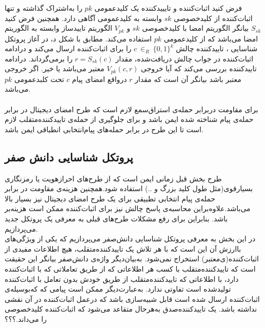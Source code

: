 فرض کنید اثبات‌کننده و تایییدکننده یک کلیدعمومی
$pk$
را به‌اشتراک گذاشته و تنها اثبات‌کننده از کلیدخصوصی
$sk$
 وابسته به کلیدعمومی آگاهی دارد. همچنین فرض کنید 
$S_{sk}$	
 بیانگر الگوریتم امضا با کلیدخصوصی
$sk$
و
$V_{pk}$
الگوریتم تاییدساز وابسته به الگوریتم امضا می‌باشد که از کلیدعمومی
$pk$
استفاده می‌کند.
مطابق با شکل د، در آغاز پروتکل شناسایی ، تاییدکننده چالش 
$c~ {\in}_R ~ \{0,1\}^k$
را برای اثبات‌کننده ارسال می‌کند و درادامه اثبات‌کننده در جواب چالش دریافت‌شده، مقدار
$r = S_{sk}(c)$
را برمی‌گرداند. درادامه تاییدکننده بررسی می‌کند که آیا خروجی
$V_{pk}(c,r)$
معتبر می‌باشد یا خیر. اگر خروجی معتبر باشد بیانگر آن است که مقدار
$r$
درواقع امضای پیام
$c$
تحت کلبدعمومی
$pk$
می‌باشد.
\\
\\
برای مقاومت دربرابر حمله‌ی استراق‌سمع لازم است که طرح امضای دیجیتال در برابر حمله‌ی پیام‌  شناخته شده ایمن باشد و برای جلوگیری از حمله‌ی تاییدکننده‌متقلب لازم است تا این طرح در برابر حمله‌های پیام‌انتخابی انطباقی ایمن باشد.
\subsection{پروتکل شناسایی دانش صفر}\label{zk_id_protocol}

طرح بخش قبل زمانی ایمن است که از طرح‌های احرازهویت یا رمزنگاری بسیارقوی(مثل طول کلید بزرگ و ..) استفاده شود.همچنین هزینه‌ی مقاومت در برابر حمله‌ی پیام انتخابی تطبیقی برای یک طرح امضای دیجیتال نیز بسیار بالا می‌باشد.‌علاوه‌براین محاسبه‌ی پاسخ چالش نیز برای اثبات‌کننده  ممکن است هزینه‌بر باشد. بنابراین برای رفع مشکلات طرح‌های قبلی به معرفی یک پروتکل جدید می‌پردازیم.
\\
در این بخش به معرفی پروتکل شناسایی دانش‌صفر می‌پردازیم که یکی از ویژگی‌های باارزش آن این است که با هر تلاش یک تاییدکننده‌متقلب، هیچ اطلاعات مفیدی از اثبات‌کننده(ی‌معتبر) استخراج نمی‌شود. به‌بیان‌دیگر واژه‌ی دانش‌صفر بیانگر این  حقیقت است که تاییدکننده‌‌متقلب با کسب هر اطلاعاتی که از طریق تعاملاتی که با اثبات‌کننده دارد، با اطلاعاتی که تاییدکننده‌متقلب از طریق خودش بدون تعامل با اثبات‌کننده تولیدشده است تفاوتی ندارد. 
به‌عبارت‌دیگر ممکن است پیامی که که‌بوسیله‌ی اثبات‌کننده ارسال شده است قابل شبیه‌سازی 
باشد که درعمل اثبات‌کننده در آن نقشی نداشته باشد.
یک تاییدکننده‌صدق به‌هرحال متقاعد می‌شود که اثبات‌کننده کلیدخصوصی را می‌داند.؟؟؟

